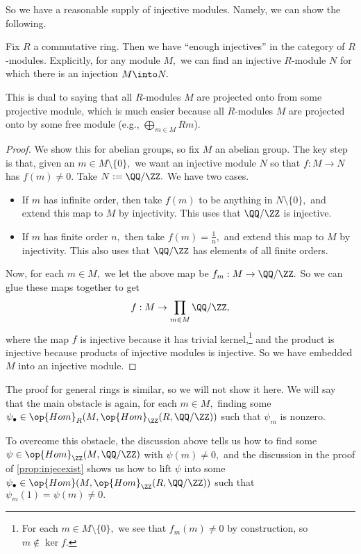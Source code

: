 \documentclass[../notes.tex]{subfiles}
\begin{document}
So we have a reasonable supply of injective modules. Namely, we can show the following.
\begin{proposition}
	Fix $R$ a commutative ring. Then we have ``enough injectives'' in the category of $R$-modules. Explicitly, for any module $M,$ we can find an injective $R$-module $N$ for which there is an injection $M\into N.$
\end{proposition}
\begin{remark}
	This is dual to saying that all $R$-modules $M$ are projected onto from some projective module, which is much easier because all $R$-modules $M$ are projected onto by some free module (e.g., $\bigoplus_{m\in M}Rm$).
\end{remark}
\begin{proof}
	We show this for abelian groups, so fix $M$ an abelian group. The key step is that, given an $m\in M\setminus\{0\},$ we want an injective module $N$ so that $f:M\to N$ has $f(m)\ne0.$ Take $N:=\QQ/\ZZ.$ We have two cases.
	\begin{itemize}
		\item If $m$ has infinite order, then take $f(m)$ to be anything in $N\setminus\{0\},$ and extend this map to $M$ by injectivity. This uses that $\QQ/\ZZ$ is injective.
		\item If $m$ has finite order $n,$ then take $f(m)=\frac1n,$ and extend this map to $M$ by injectivity. This also uses that $\QQ/\ZZ$ has elements of all finite orders.
	\end{itemize}
	Now, for each $m\in M,$ we let the above map be $f_m:M\to\QQ/\ZZ.$ So we can glue these maps together to get
	\[f:M\to\prod_{m\in M}\QQ/\ZZ,\]
	where the map $f$ is injective because it has trivial kernel,\footnote{For each $m\in M\setminus\{0\},$ we see that $f_m(m)\ne0$ by construction, so $m\notin\ker f.$} and the product is injective because products of injective modules is injective. So we have embedded $M$ into an injective module.
\end{proof}
The proof for general rings is similar, so we will not show it here. We will say that the main obstacle is again, for each $m\in M,$ finding some $\psi_\bullet\in\op{Hom}_R(M,\op{Hom}_\ZZ(R,\QQ/\ZZ))$ such that $\psi_m$ is nonzero.

To overcome this obstacle, the discussion above tells us how to find some $\psi\in\op{Hom}_\ZZ(M,\QQ/\ZZ)$ with $\psi(m)\ne0,$ and the discussion in the proof of \autoref{prop:injecexist} shows us how to lift $\psi$ into some $\psi_\bullet\in\op{Hom}(M,\op{Hom}_\ZZ(R,\QQ/\ZZ))$ such that $\psi_m(1)=\psi(m)\ne0.$
\end{document}
